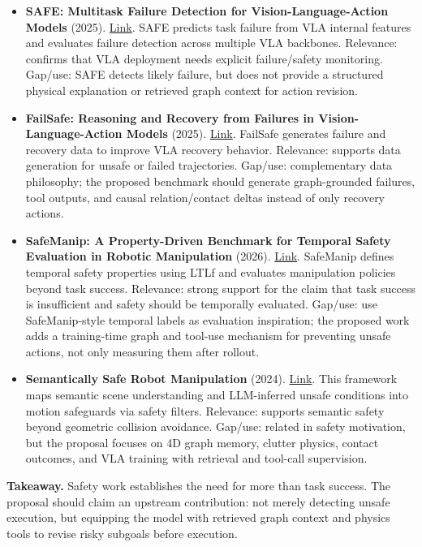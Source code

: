 \begin{itemize}
\item \textbf{SAFE: Multitask Failure Detection for Vision-Language-Action Models} (2025). \href{https://arxiv.org/abs/2506.09937}{Link}. SAFE predicts task failure from VLA internal features and evaluates failure detection across multiple VLA backbones. Relevance: confirms that VLA deployment needs explicit failure/safety monitoring. Gap/use: SAFE detects likely failure, but does not provide a structured physical explanation or retrieved graph context for action revision.

\item \textbf{FailSafe: Reasoning and Recovery from Failures in Vision-Language-Action Models} (2025). \href{https://arxiv.org/abs/2510.01642}{Link}. FailSafe generates failure and recovery data to improve VLA recovery behavior. Relevance: supports data generation for unsafe or failed trajectories. Gap/use: complementary data philosophy; the proposed benchmark should generate graph-grounded failures, tool outputs, and causal relation/contact deltas instead of only recovery actions.

\item \textbf{SafeManip: A Property-Driven Benchmark for Temporal Safety Evaluation in Robotic Manipulation} (2026). \href{https://arxiv.org/abs/2605.12386}{Link}. SafeManip defines temporal safety properties using LTLf and evaluates manipulation policies beyond task success. Relevance: strong support for the claim that task success is insufficient and safety should be temporally evaluated. Gap/use: use SafeManip-style temporal labels as evaluation inspiration; the proposed work adds a training-time graph and tool-use mechanism for preventing unsafe actions, not only measuring them after rollout.

\item \textbf{Semantically Safe Robot Manipulation} (2024). \href{https://arxiv.org/abs/2410.15185}{Link}. This framework maps semantic scene understanding and LLM-inferred unsafe conditions into motion safeguards via safety filters. Relevance: supports semantic safety beyond geometric collision avoidance. Gap/use: related in safety motivation, but the proposal focuses on 4D graph memory, clutter physics, contact outcomes, and VLA training with retrieval and tool-call supervision.
\end{itemize}

\textbf{Takeaway.} Safety work establishes the need for more than task success. The proposal should claim an upstream contribution: not merely detecting unsafe execution, but equipping the model with retrieved graph context and physics tools to revise risky subgoals before execution.

